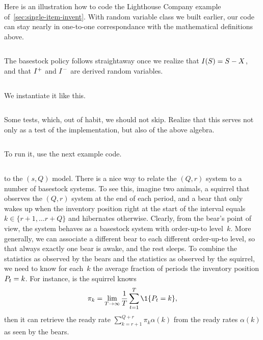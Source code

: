 \documentclass[stochastic-or.tex]{subfiles}
\begin{document}
Here is an illustration how to code the Lighthouse Company example of~\cref{sec:single-item-invent}.
With random variable class we built earlier, our code can stay nearly in one-to-one correspondance with the mathematical definitions above.
\inputminted[firstline=2, lastline=5]{python}{../code/lighthouse.py} %

The basestock policy follows straightaway once we realize that $I(S) = S - X$, and that $I^{+}$ and $I^{-}$ are derived random variables.
\inputminted[firstline=11, lastline=43]{python}{../code/lighthouse.py} %
We instantiate it like this.
\inputminted[firstline=50, lastline=58]{python}{../code/lighthouse.py} %
Some tests, which, out of habit, we should not skip. Realize that this serves not only as a test of the implementation, but also  of the above algebra.
\inputminted[firstline=62, lastline=67]{python}{../code/lighthouse.py} %
To run it, use the next example code.
\inputminted[firstline=71, lastline=73]{python}{../code/lighthouse.py} %



 to the $(s, Q)$ model.
There is a nice way to relate the $(Q,r)$ system to a number of basestock systems.
To see this, imagine two animals, a squirrel that observes the $(Q,r)$ system at the end of each period, and a bear that only wakes up when the inventory position right at the start of the interval equals~$k \in \{r+1, \ldots r+Q\}$ and hibernates otherwise.
Clearly, from the bear's point of view, the system behaves as a basestock system with order-up-to level~$k$.
More generally, we can associate a different bear to each different order-up-to level, so that always exactly one bear is awake, and the rest sleeps.
To combine the statistics as observed by the bears and the statistics as observed by the squirrel, we need to know for each~$k$ the average fraction of periods the inventory position $P_{t} = k$.
For instance, is the squirrel  knows
\begin{equation*}
\pi_{k} = \lim_{T\to \infty} \frac{1}{T} \sum_{t=1}^{T}\1{\IP_t = k},
\end{equation*}
then it can retrieve the ready rate $\sum_{k=r+1}^{Q+r} \pi_k \alpha(k)$ from the ready rates $\alpha(k)$ as seen by the bears.
\end{document}
